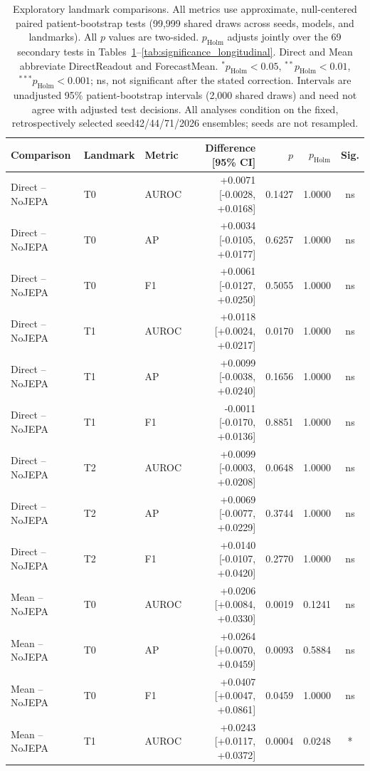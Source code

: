 \begin{table}[t]
\centering
\small
\caption{Exploratory landmark comparisons. All metrics use approximate, null-centered paired patient-bootstrap tests (99,999 shared draws across seeds, models, and landmarks). All $p$ values are two-sided. $p_{\mathrm{Holm}}$ adjusts jointly over the 69 secondary tests in Tables~\ref{tab:significance_landmarks}--\ref{tab:significance_longitudinal}. Direct and Mean abbreviate DirectReadout and ForecastMean. $^{*}p_{\mathrm{Holm}}<0.05$, $^{**}p_{\mathrm{Holm}}<0.01$, $^{***}p_{\mathrm{Holm}}<0.001$; ns, not significant after the stated correction. Intervals are unadjusted 95\% patient-bootstrap intervals (2,000 shared draws) and need not agree with adjusted test decisions. All analyses condition on the fixed, retrospectively selected seed42/44/71/2026 ensembles; seeds are not resampled.}
\label{tab:significance_landmarks}
\begin{tabular}{lllrrrc}
\toprule
Comparison & Landmark & Metric & Difference [95\% CI] & $p$ & $p_{\mathrm{Holm}}$ & Sig. \\
\midrule
Direct -- NoJEPA & T0 & AUROC & +0.0071 [-0.0028, +0.0168] & 0.1427 & 1.0000 & ns \\
Direct -- NoJEPA & T0 & AP & +0.0034 [-0.0105, +0.0177] & 0.6257 & 1.0000 & ns \\
Direct -- NoJEPA & T0 & F1 & +0.0061 [-0.0127, +0.0250] & 0.5055 & 1.0000 & ns \\
Direct -- NoJEPA & T1 & AUROC & +0.0118 [+0.0024, +0.0217] & 0.0170 & 1.0000 & ns \\
Direct -- NoJEPA & T1 & AP & +0.0099 [-0.0038, +0.0240] & 0.1656 & 1.0000 & ns \\
Direct -- NoJEPA & T1 & F1 & -0.0011 [-0.0170, +0.0136] & 0.8851 & 1.0000 & ns \\
Direct -- NoJEPA & T2 & AUROC & +0.0099 [-0.0003, +0.0208] & 0.0648 & 1.0000 & ns \\
Direct -- NoJEPA & T2 & AP & +0.0069 [-0.0077, +0.0229] & 0.3744 & 1.0000 & ns \\
Direct -- NoJEPA & T2 & F1 & +0.0140 [-0.0107, +0.0420] & 0.2770 & 1.0000 & ns \\
Mean -- NoJEPA & T0 & AUROC & +0.0206 [+0.0084, +0.0330] & 0.0019 & 0.1241 & ns \\
Mean -- NoJEPA & T0 & AP & +0.0264 [+0.0070, +0.0459] & 0.0093 & 0.5884 & ns \\
Mean -- NoJEPA & T0 & F1 & +0.0407 [+0.0047, +0.0861] & 0.0459 & 1.0000 & ns \\
Mean -- NoJEPA & T1 & AUROC & +0.0243 [+0.0117, +0.0372] & 0.0004 & 0.0248 & * \\

\end{tabular}
\end{table}
